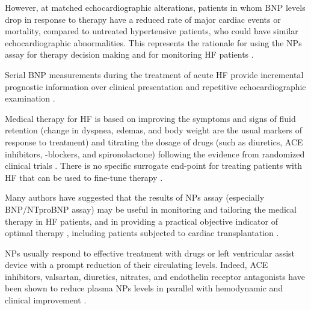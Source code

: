 \documentclass[14pt,a4paper,onecolumn]{extarticle}
\begin{document}
However, at matched echocardiographic alterations, patients in whom BNP levels drop in response to therapy have a reduced rate of major cardiac events or mortality, compared to untreated hypertensive patients, who could have similar echocardiographic abnormalities. This represents the rationale for using the NPs assay for therapy decision making and for monitoring HF patients \citep{bib35} \citep{bib363} \citep{bib364}.

Serial BNP measurements during the treatment of acute HF provide incremental prognostic information over clinical presentation and repetitive echocardiographic examination \citep{bib3179}.

Medical therapy for HF is based on improving the symptoms and signs of fluid retention (change in dyspnea, edemas, and body weight are the usual markers of response to treatment) and titrating the dosage of drugs (such as diuretics, ACE inhibitors, \beta-blockers, and spironolactone) following the evidence from randomized clinical trials \citep{bib365} \citep{bib368} \citep{bib369} \citep{bib370}. There is no specific surrogate end-point for treating patients with HF that can be used to fine-tune therapy \citep{bib365} \citep{bib368} \citep{bib369} \citep{bib370}.

Many authors have suggested that the results of NPs assay (especially BNP/NTproBNP assay) may be useful in monitoring and tailoring the medical therapy in HF patients, and in providing a practical objective indicator of optimal therapy \citep{bib361} \citep{bib362} \citep{bib363} \citep{bib364} \citep{bib365} \citep{bib368} \citep{bib369} \citep{bib370} \citep{bib385} \citep{bib390} \citep{bib3168} \citep{bib3252} \citep{Troughton2000} \citep{bib3286} \citep{bib3255} \citep{bib3256} \citep{bib3257} \citep{bib3258} \citep{bib3259} \citep{bib3260} \citep{bib3261} \citep{bib3262} \citep{bib3263} \citep{bib3264}  \citep{Mueller2004}, including patients subjected to cardiac transplantation \citep{bib3266}.

NPs usually respond to effective treatment with drugs \citep{bib35} \citep{bib361} \citep{bib362} \citep{bib363} \citep{bib364} \citep{bib365} or left ventricular assist device \citep{bib3267} \citep{bib3268} with a prompt reduction of their circulating levels. Indeed, ACE inhibitors, valsartan, diuretics, nitrates, and endothelin receptor antagonists have been shown to reduce plasma NPs levels in parallel with hemodynamic and clinical improvement \citep{bib362} \citep{bib363} \citep{bib3252} \citep{bib3258} \citep{bib3271} \citep{bib3272} \citep{bib3273} \citep{bib3284} \citep{bib3275} \citep{bib3276} \citep{bib3277}.
\end{document}
